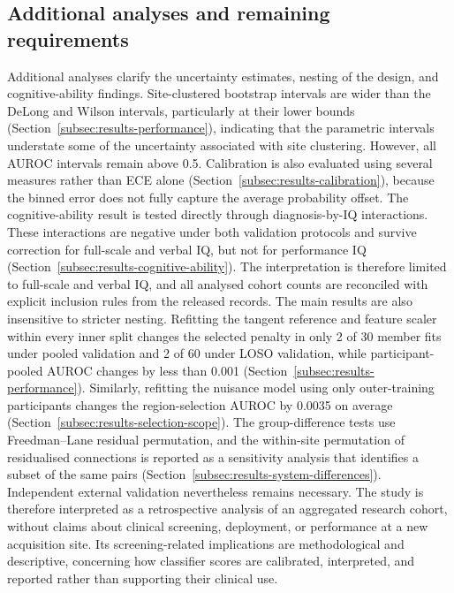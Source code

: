 \subsection{Additional analyses and remaining requirements}
\label{subsec:required-validation}

Additional analyses clarify the uncertainty estimates, nesting of the design, and cognitive-ability findings. Site-clustered bootstrap intervals are wider than the DeLong and Wilson intervals, particularly at their lower bounds (Section~\ref{subsec:results-performance}), indicating that the parametric intervals understate some of the uncertainty associated with site clustering. However, all AUROC intervals remain above 0.5. Calibration is also evaluated using several measures rather than ECE alone (Section~\ref{subsec:results-calibration}), because the binned error does not fully capture the average probability offset. The cognitive-ability result is tested directly through diagnosis-by-IQ interactions. These interactions are negative under both validation protocols and survive correction for full-scale and verbal IQ, but not for performance IQ (Section~\ref{subsec:results-cognitive-ability}). The interpretation is therefore limited to full-scale and verbal IQ, and all analysed cohort counts are reconciled with explicit inclusion rules from the released records. The main results are also insensitive to stricter nesting. Refitting the tangent reference and feature scaler within every inner split changes the selected penalty in only 2 of 30 member fits under pooled validation and 2 of 60 under LOSO validation, while participant-pooled AUROC changes by less than 0.001 (Section~\ref{subsec:results-performance}). Similarly, refitting the nuisance model using only outer-training participants changes the region-selection AUROC by 0.0035 on average (Section~\ref{subsec:results-selection-scope}). The group-difference tests use Freedman--Lane residual permutation, and the within-site permutation of residualised connections is reported as a sensitivity analysis that identifies a subset of the same pairs (Section~\ref{subsec:results-system-differences}). Independent external validation nevertheless remains necessary. The study is therefore interpreted as a retrospective analysis of an aggregated research cohort, without claims about clinical screening, deployment, or performance at a new acquisition site. Its screening-related implications are methodological and descriptive, concerning how classifier scores are calibrated, interpreted, and reported rather than supporting their clinical use.

